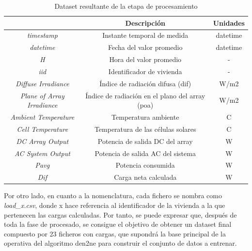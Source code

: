 \vspace{3mm}

\begin{table}[H]
  \centering
  \begin{tabular}{|c|c|c|}
  \hline
  \rowcolor[HTML]{AAAAAA} 
  \multicolumn{1}{|c|}{\cellcolor[HTML]{AAAAAA}Campo} & \multicolumn{1}{c|}{\cellcolor[HTML]{AAAAAA}Descripción} & Unidades \\ \hline
  \textit{timestamp} & Instante temporal de medida & datetime \\ \hline
  \textit{datetime} & Fecha del valor promedio & datetime \\ \hline
  \textit{H} & Hora del valor promedio & - \\ \hline
  \textit{iid} & Identificador de vivienda & - \\ \hline
  \textit{Diffuse Irradiance} & Índice de radiación difusa (\gls{dif}) & W/m2 \\ \hline
  \textit{Plane of Array Irradiance} & Índice de radiación en el plano del array (\acrshort{poa}) & W/m2 \\ \hline 
  \textit{Ambient Temperature} & Temperatura ambiente & C \\ \hline
  \textit{Cell Temperature} & Temperatura de las células solares & C \\ \hline
  \textit{DC Array Output} & Potencia de salida DC del array & W \\ \hline
  \textit{AC System Output} & Potencia de salida AC del sistema & W \\ \hline
  \textit{Pavg} & Potencia consumida & W \\ \hline
  \textit{Dif} & Carga neta calculada & W \\ \hline
  \end{tabular}
  \caption{Dataset resultante de la etapa de procesamiento}
  \label{tab:datacombinacion}
\end{table}

\vspace{3mm}

Por otro lado, en cuanto a la nomenclatura, cada fichero se nombra como \textit{load\_x.csv}, donde x hace referencia al identificador de la vivienda a la que pertenecen las cargas calculadas. Por tanto, se puede expresar que, después de toda la fase de procesado, se consigue el objetivo de obtener un dataset final compuesto por 23 ficheros con cargas, que supondrá la base principal de la operativa del algoritmo \gls{den2ne} para construir el conjunto de datos a entrenar.

